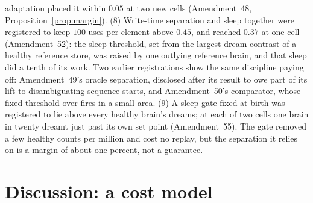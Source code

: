 \documentclass[11pt]{article}
\theoremstyle{definition}
\theoremstyle{plain}
\begin{document}
adaptation placed it within $0.05$ at two new cells (Amendment~48,
Proposition~\ref{prop:margin}).
(8) Write-time separation and sleep together were registered to keep $100$ uses
per element above $0.45$, and reached $0.37$ at one cell (Amendment~52): the
sleep threshold, set from the largest dream contrast of a healthy reference
store, was raised by one outlying reference brain, and that sleep did a tenth
of its work. Two earlier registrations show the same discipline paying off:
Amendment~49's oracle separation, disclosed after its result to owe part of
its lift to disambiguating sequence starts, and Amendment~50's comparator,
whose fixed threshold over-fires in a small area.
(9) A sleep gate fixed at birth was registered to lie above every healthy
brain's dreams; at each of two cells one brain in twenty dreamt just past its
own set point (Amendment~55). The gate removed a few healthy counts per
million and cost no replay, but the separation it relies on is a margin of
about one percent, not a guarantee.

\section{Discussion: a cost model}\label{sec:discussion}
\end{document}
